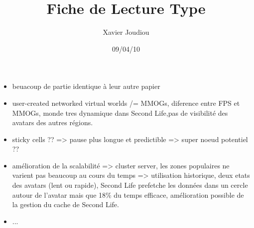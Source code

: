 \documentclass[11pt,a4paper]{article}
\title{Fiche de Lecture Type}
\author{Xavier Joudiou}
\date{09/04/10}
\begin{document}
	
  \begin{itemize}
  \renewcommand{\labelitemi}{$\Rightarrow$}
	\item beuacoup de partie identique à leur autre papier
	\item user-created networked virtual worlds /= MMOGs, diference entre FPS et MMOGs, monde tres dynamique dans Second Life,pas de visibilité des avatars des autres régions.
	\item sticky cells ?? => pause plus longue et predictible => super noeud potentiel ??
	\item amélioration de la scalabilité => cluster server, les zones populaires ne varient pas beaucoup au cours du temps => utilisation historique, deux etats des avatars (lent ou rapide), Second Life prefetche les données dans un cercle autour de l'avatar mais que 18\% du temps efficace, amélioration possible de la gestion du cache de Second Life.
	\item ...
  \end{itemize}
\end{document}

